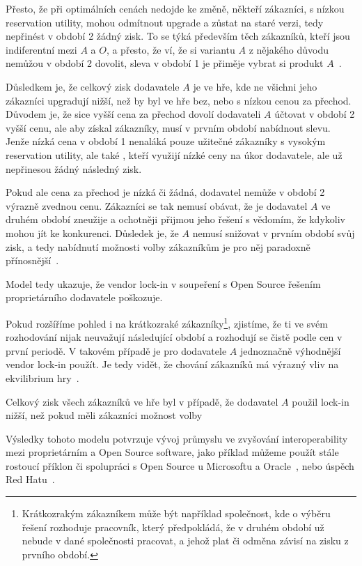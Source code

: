 \begin{multicols}{2}
	Přesto, že při optimálních cenách nedojde ke změně, někteří zákazníci, s nízkou reservation utility, mohou odmítnout upgrade a zůstat na staré verzi, tedy nepřinést v období 2 žádný zisk. To se týká především těch zákazníků, kteří jsou indiferentní mezi $A$ a $O$, a přesto, že ví, že si variantu $A$ z nějakého důvodu nemůžou v období 2 dovolit, sleva v období 1 je přiměje vybrat si produkt $A$~\cite[str. 6]{lock-in-competition}.

	Důsledkem je, že celkový zisk dodavatele $A$ je ve hře, kde ne všichni jeho zákazníci upgradují nižší, než by byl ve hře bez, nebo s nízkou cenou za přechod. Důvodem je, že sice vyšší cena za přechod dovolí dodavateli $A$ účtovat v období 2 vyšší cenu, ale aby získal zákazníky, musí v prvním období nabídnout slevu. Jenže nízká cena v období 1 nenaláká pouze užitečné zákazníky s vysokým reservation utility, ale také , kteří využijí nízké ceny na úkor dodavatele, ale už nepřinesou žádný následný zisk.

	Pokud ale cena za přechod je nízká či žádná, dodavatel nemůže v období 2 výrazně zvednou cenu. Zákazníci se tak nemusí obávat, že je dodavatel $A$ ve druhém období zneužije a ochotněji přijmou jeho řešení s vědomím, že kdykoliv mohou jít ke konkurenci. Důsledek je, že $A$ nemusí snižovat v prvním období svůj zisk, a tedy nabídnutí možnosti volby zákazníkům je pro něj paradoxně přínosnější~\cite[str. 7 a kap. 3: lemma 2]{lock-in-competition}.

	Model tedy ukazuje, že vendor lock-in v soupeření s Open Source řešením proprietárního dodavatele poškozuje.

	Pokud rozšíříme pohled i na krátkozraké zákazníky\footnote{Krátkozrakým zákazníkem může být například společnost, kde o výběru řešení rozhoduje pracovník, který předpokládá, že v druhém období už nebude v dané společnosti pracovat, a jehož plat či odměna závisí na zisku z prvního období.}, zjistíme, že ti ve svém rozhodování nijak neuvažují následující období a rozhodují se čistě podle cen v první periodě. V takovém případě je pro dodavatele $A$ jednoznačně výhodnější vendor lock-in použít. Je tedy vidět, že chování zákazníků má výrazný vliv na ekvilibrium hry~\cite[kap. 4]{lock-in-competition}.

	Celkový zisk všech zákazníků ve hře byl v případě, že dodavatel $A$ použil lock-in nižší, než pokud měli zákazníci možnost volby~\cite[kap. 5]{lock-in-competition}

	Výsledky tohoto modelu potvrzuje vývoj průmyslu ve zvyšování interoperability mezi proprietárním a Open Source software, jako příklad můžeme použít stále rostoucí příklon či spolupráci s Open Source u Microsoftu a Oracle~\cite[kap. 6]{lock-in-competition}, nebo úspěch Red Hatu~\cite{redhat-growth}.


\end{multicols}
